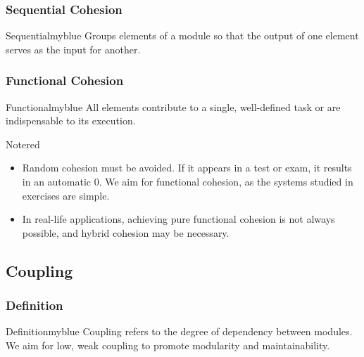 \vspace{0.25cm}

\subsubsection*{Sequential Cohesion}
\begin{prettyBox}{Sequential}{myblue}
Groups elements of a module so that the output of one element serves as
the input for another.
\end{prettyBox}
\vspace{0.25cm}

\subsubsection*{Functional Cohesion}
\begin{prettyBox}{Functional}{myblue}
All elements contribute to a single, well-defined task or are indispensable to its execution.
\end{prettyBox}

\vspace{1cm}

\begin{prettyBox}{Note}{red}
\begin{itemize}
    \item Random cohesion must be avoided. If it appears in a test or exam, it results in an automatic 0. We aim for functional cohesion, as the systems studied in exercises are simple.  
    \item In real-life applications, achieving pure functional cohesion is not always possible, and hybrid cohesion may be necessary.  
\end{itemize}
\end{prettyBox}

\newpage
\null
\subsection{Coupling}
\subsubsection{Definition}
\begin{prettyBox}{Definition}{myblue}
Coupling refers to the degree of dependency between modules. We aim for low,
weak coupling to promote modularity and maintainability.
\end{prettyBox}
\vspace{0.35cm}

